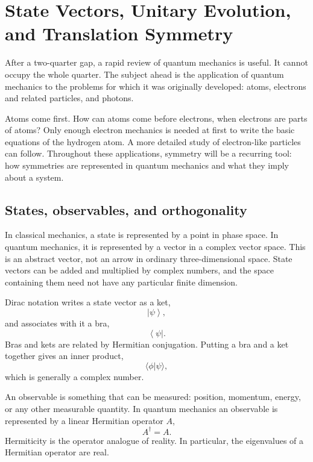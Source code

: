 \chapter{State Vectors, Unitary Evolution, and Translation Symmetry}
\providecommand{\ket}[1]{\left\lvert#1\right\rangle}
\providecommand{\bra}[1]{\left\langle#1\right\rvert}

After a two-quarter gap, a rapid review of quantum mechanics is useful. It cannot occupy the whole quarter. The subject ahead is the application of quantum mechanics to the problems for which it was originally developed: atoms, electrons and related particles, and photons.

Atoms come first. How can atoms come before electrons, when electrons are parts of atoms? Only enough electron mechanics is needed at first to write the basic equations of the hydrogen atom. A more detailed study of electron-like particles can follow. Throughout these applications, symmetry will be a recurring tool: how symmetries are represented in quantum mechanics and what they imply about a system.

\section{States, observables, and orthogonality}

In classical mechanics, a state is represented by a point in phase space. In quantum mechanics, it is represented by a vector in a complex vector space. This is an abstract vector, not an arrow in ordinary three-dimensional space. State vectors can be added and multiplied by complex numbers, and the space containing them need not have any particular finite dimension.

Dirac notation writes a state vector as a ket,
\begin{equation}
\ket{\psi},
\end{equation}
and associates with it a bra,
\begin{equation}
\bra{\psi}.
\end{equation}
Bras and kets are related by Hermitian conjugation. Putting a bra and a ket together gives an inner product,
\begin{equation}
\langle\phi|\psi\rangle,
\end{equation}
which is generally a complex number.

An observable is something that can be measured: position, momentum, energy, or any other measurable quantity. In quantum mechanics an observable is represented by a linear Hermitian operator \(A\),
\begin{equation}
A^\dagger=A.
\end{equation}
Hermiticity is the operator analogue of reality. In particular, the eigenvalues of a Hermitian operator are real.


